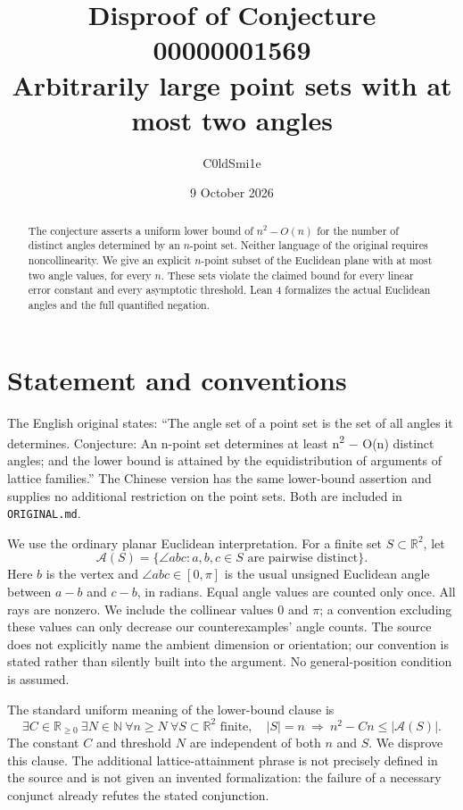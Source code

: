 \documentclass[11pt]{article}
\title{Disproof of Conjecture 00000001569\\\large Arbitrarily large point sets with at most two angles}
\author{C0ldSmi1e}
\date{9 October 2026}
\newcommand{\Ang}{\mathcal A}
\begin{document}
\maketitle
\begin{abstract}
The conjecture asserts a uniform lower bound of $n^2-O(n)$ for the number
of distinct angles determined by an $n$-point set. Neither language of the
original requires noncollinearity. We give an explicit $n$-point subset of
the Euclidean plane with at most two angle values, for every $n$. These
sets violate the claimed bound for every linear error constant and every
asymptotic threshold. Lean 4 formalizes the actual Euclidean angles and
the full quantified negation.
\end{abstract}

\section{Statement and conventions}
The English original states: ``The angle set of a point set is the set of
all angles it determines. Conjecture: An n-point set determines at least
n\textsuperscript{2} $-$ O(n) distinct angles; and the lower bound is attained
by the equidistribution of arguments of lattice families.'' The Chinese
version has the same lower-bound assertion and supplies no additional
restriction on the point sets. Both are included in \texttt{ORIGINAL.md}.

We use the ordinary planar Euclidean interpretation. For a finite set
$S\subset\mathbb R^2$, let
\[
 \Ang(S)=\{\angle abc : a,b,c\in S\text{ are pairwise distinct}\}.
\]
Here $b$ is the vertex and $\angle abc\in[0,\pi]$ is the usual unsigned
Euclidean angle between $a-b$ and $c-b$, in radians. Equal angle values
are counted only once. All rays are nonzero. We include the collinear
values $0$ and $\pi$; a convention excluding these values can only decrease
our counterexamples' angle counts. The source does not explicitly name the
ambient dimension or orientation; our convention is stated rather than
silently built into the argument. No general-position condition is assumed.

The standard uniform meaning of the lower-bound clause is
\begin{equation}\label{eq:claim}
 \exists C\in\mathbb R_{\ge0}\ \exists N\in\mathbb N\
 \forall n\ge N\ \forall S\subset\mathbb R^2\text{ finite},\quad
 |S|=n\ \Longrightarrow\ n^2-Cn\le |\Ang(S)|.
\end{equation}
The constant $C$ and threshold $N$ are independent of both $n$ and $S$.
We disprove this clause. The additional lattice-attainment phrase is not
precisely defined in the source and is not given an invented formalization:
the failure of a necessary conjunct already refutes the stated conjunction.
\end{document}
